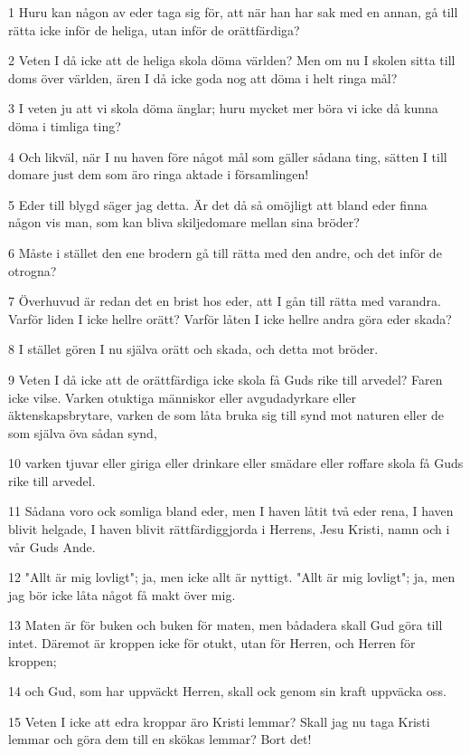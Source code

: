 \par 1 Huru kan någon av eder taga sig för, att när han har sak med en annan, gå till rätta icke inför de heliga, utan inför de orättfärdiga?
\par 2 Veten I då icke att de heliga skola döma världen? Men om nu I skolen sitta till doms över världen, ären I då icke goda nog att döma i helt ringa mål?
\par 3 I veten ju att vi skola döma änglar; huru mycket mer böra vi icke då kunna döma i timliga ting?
\par 4 Och likväl, när I nu haven före något mål som gäller sådana ting, sätten I till domare just dem som äro ringa aktade i församlingen!
\par 5 Eder till blygd säger jag detta. Är det då så omöjligt att bland eder finna någon vis man, som kan bliva skiljedomare mellan sina bröder?
\par 6 Måste i stället den ene brodern gå till rätta med den andre, och det inför de otrogna?
\par 7 Överhuvud är redan det en brist hos eder, att I gån till rätta med varandra. Varför liden I icke hellre orätt? Varför låten I icke hellre andra göra eder skada?
\par 8 I stället gören I nu själva orätt och skada, och detta mot bröder.
\par 9 Veten I då icke att de orättfärdiga icke skola få Guds rike till arvedel? Faren icke vilse. Varken otuktiga människor eller avgudadyrkare eller äktenskapsbrytare, varken de som låta bruka sig till synd mot naturen eller de som själva öva sådan synd,
\par 10 varken tjuvar eller giriga eller drinkare eller smädare eller roffare skola få Guds rike till arvedel.
\par 11 Sådana voro ock somliga bland eder, men I haven låtit två eder rena, I haven blivit helgade, I haven blivit rättfärdiggjorda i Herrens, Jesu Kristi, namn och i vår Guds Ande.
\par 12 "Allt är mig lovligt"; ja, men icke allt är nyttigt. "Allt är mig lovligt"; ja, men jag bör icke låta något få makt över mig.
\par 13 Maten är för buken och buken för maten, men bådadera skall Gud göra till intet. Däremot är kroppen icke för otukt, utan för Herren, och Herren för kroppen;
\par 14 och Gud, som har uppväckt Herren, skall ock genom sin kraft uppväcka oss.
\par 15 Veten I icke att edra kroppar äro Kristi lemmar? Skall jag nu taga Kristi lemmar och göra dem till en skökas lemmar? Bort det!
